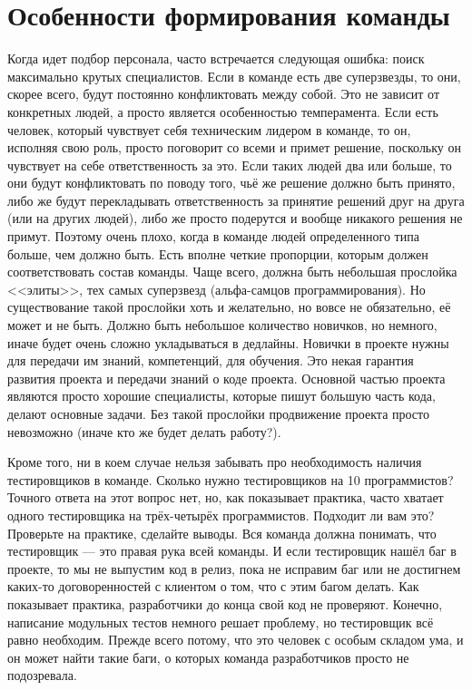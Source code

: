 \documentclass{../../text-style}
\begin{document}
\section{Особенности формирования команды}

Когда идет подбор персонала, часто встречается следующая ошибка: поиск максимально крутых специалистов. Если в команде есть две суперзвезды, то они, скорее всего, будут постоянно конфликтовать между собой. Это не зависит от конкретных людей, а просто является особенностью темперамента. Если есть человек, который чувствует себя техническим лидером в команде, то он, исполняя свою роль, просто поговорит со всеми и примет решение, поскольку он чувствует на себе ответственность за это. Если таких людей два или больше, то они будут конфликтовать по поводу того, чьё же решение должно быть принято, либо же будут перекладывать ответственность за принятие решений друг на друга (или на других людей), либо же просто подерутся и вообще никакого решения не примут. Поэтому очень плохо, когда в команде людей определенного типа больше, чем должно быть. Есть вполне четкие пропорции, которым должен соответствовать состав команды. Чаще всего, должна быть небольшая прослойка <<элиты>>, тех самых суперзвезд (альфа-самцов программирования). Но существование такой прослойки хоть и желательно, но вовсе не обязательно, её может и не быть. Должно быть небольшое количество новичков, но немного, иначе будет очень сложно укладываться в дедлайны. Новички в проекте нужны для передачи им знаний, компетенций, для обучения. Это некая гарантия развития проекта и передачи знаний о коде проекта. Основной частью проекта являются просто хорошие специалисты, которые пишут большую часть кода, делают основные задачи. Без такой прослойки продвижение проекта просто невозможно (иначе кто же будет делать работу?).

Кроме того, ни в коем случае нельзя забывать про необходимость наличия тестировщиков в команде. Сколько нужно тестировщиков на 10 программистов? Точного ответа на этот вопрос нет, но, как показывает практика, часто хватает одного тестировщика на трёх-четырёх программистов. Подходит ли вам это? Проверьте на практике, сделайте выводы. Вся команда должна понимать, что тестировщик --- это правая рука всей команды. И если тестировщик нашёл баг в проекте, то мы не выпустим код в релиз, пока не исправим баг или не достигнем каких-то договоренностей с клиентом о том, что с этим багом делать. Как показывает практика, разработчики до конца свой код не проверяют. Конечно, написание модульных тестов немного решает проблему, но тестировщик всё равно необходим. Прежде всего потому, что это человек с особым складом ума, и он может найти такие баги, о которых команда разработчиков просто не подозревала.
\end{document}
